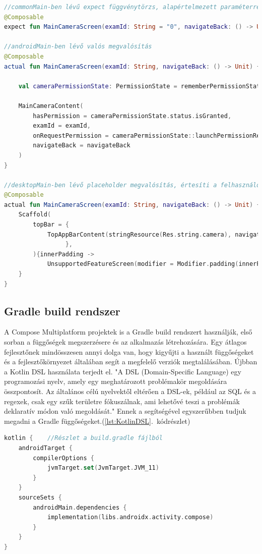 \begin{lstlisting}[caption={Expect és actual használata}, label={lst:ExpectActual}, language=Kotlin]
//commonMain-ben lévű expect függvénytörzs, alapértelmezett paraméterrel.
@Composable
expect fun MainCameraScreen(examId: String = "0", navigateBack: () -> Unit)

//androidMain-ben lévő valós megvalósítás
@Composable
actual fun MainCameraScreen(examId: String, navigateBack: () -> Unit) {

    val cameraPermissionState: PermissionState = rememberPermissionState(android.Manifest.permission.CAMERA)

    MainCameraContent(
        hasPermission = cameraPermissionState.status.isGranted,
        examId = examId,
        onRequestPermission = cameraPermissionState::launchPermissionRequest,
        navigateBack = navigateBack
    )
}

//desktopMain-ben lévő placeholder megvalósítás, értesíti a felhasználót, hogy ez a funkció az eszközén nem támogatott
@Composable
actual fun MainCameraScreen(examId: String, navigateBack: () -> Unit) {
    Scaffold(
        topBar = {
            TopAppBarContent(stringResource(Res.string.camera), navigateBack)
                 },
        ){innerPadding ->
            UnsupportedFeatureScreen(modifier = Modifier.padding(innerPadding))
    }
}
\end{lstlisting}

\subsection{Gradle build rendszer}

A Compose Multiplatform projektek is a Gradle build rendszert használják, első sorban a függőségek megszerzésere és az alkalmazás létrehozására.
Egy átlagos fejlesztőnek mindösszesen annyi dolga van, hogy kigyűjti a használt függőségeket és a fejlesztőkörnyezet általában segít a megfelelő verziók megtalálásában.
Újbban a Kotlin DSL használata terjedt el.
"A DSL (Domain-Specific Language) egy programozási nyelv, amely egy meghatározott problémakör megoldására összpontosít. Az általános célú nyelvektől eltérően a DSL-ek, például az SQL és a regexek, csak egy szűk területre fókuszálnak, ami lehetővé teszi a problémák deklaratív módon való megoldását."\cite{KotlinDSL}
Ennek a segítségével egyszerűbben tudjuk megadni a Gradle függőségeket.(\ref{lst:KotlinDSL}.~kódrészlet)

\begin{lstlisting}[caption={Kotlin DSL}, label={lst:KotlinDSL}, language=Kotlin]
kotlin {    //Részlet a build.gradle fájlból
    androidTarget {
        compilerOptions {
            jvmTarget.set(JvmTarget.JVM_11)
        }
    }
    sourceSets {
        androidMain.dependencies {
            implementation(libs.androidx.activity.compose)
        }
    }
}
\end{lstlisting}

